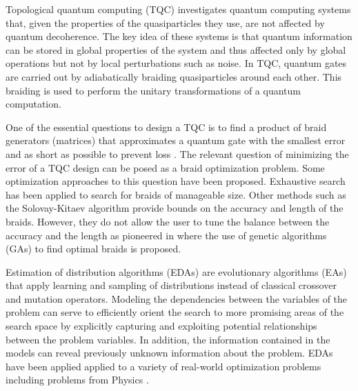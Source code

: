  Topological quantum computing (TQC) \cite{Bonesteel_et_al:2005,Kitaev:2003,Sarma_et_al:2006} investigates quantum computing systems that, given the properties of the quasiparticles they use, are not affected by quantum decoherence.  The key idea of these systems is that quantum information can be stored in global properties of the system and thus affected only by global operations but not by local perturbations such as noise. In TQC, quantum gates are carried out by adiabatically braiding quasiparticles around each other. This braiding is used to perform the unitary transformations of a quantum computation. 

 One of the essential questions to design a TQC is to find a product of braid generators (matrices) that approximates a quantum gate with the smallest error and as short as possible to prevent loss \cite{Mcdonald_and_Katzgraber:2013}. The relevant question of minimizing the error of a TQC design can be posed as a braid optimization problem. Some optimization approaches to this question have been proposed. Exhaustive search  \cite{Bonesteel_et_al:2005} has been applied to search for braids of manageable size.  Other methods such as the Solovay-Kitaev algorithm \cite{Dawson_et_al:2005} provide bounds on the accuracy and length of the braids.  However, they do not allow the user to  tune the balance between the accuracy and the length as pioneered in \cite{Mcdonald_and_Katzgraber:2013} where   the use of genetic algorithms (GAs) to find optimal braids is proposed. 


 Estimation of distribution algorithms (EDAs) \cite{Larranhaga_and_Lozano:2002r,Muhlenbein_and_Paas:1996r,Larranaga_et_al:2012,Shakya_and_Santana:2012a} are evolutionary algorithms (EAs) that apply learning and sampling of distributions instead of classical crossover and mutation operators. Modeling the dependencies between the variables of the problem can serve to efficiently orient the search to more promising areas of the search space by explicitly capturing and exploiting potential relationships between the problem variables. In addition, the information contained in the models can reveal previously unknown information about the problem. EDAs have been applied applied to a variety of real-world optimization problems including problems from Physics \cite{Pelikan_and_Goldberg:2003r,Pelikan_and_Katzgraber:2009,Shakya_et_al:2011}.  

